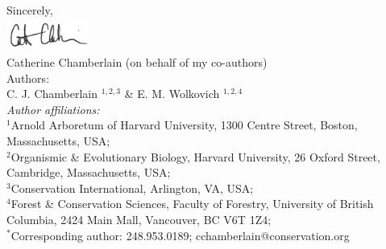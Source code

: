 \documentclass[11pt,a4paper]{article}
\begin{document}
\vspace{1.5ex}
\noindent Sincerely, \\
\includegraphics[width=0.2\textwidth]{full_signature.jpg} \\
\noindent Catherine Chamberlain (on behalf of my co-authors)
\vspace{2ex}\\
\noindent Authors:\\
C. J. Chamberlain $^{1,2,3}$ \& E. M. Wolkovich $^{1,2,4}$
\vspace{2ex}\\
\emph{Author affiliations:}\\
$^{1}$Arnold Arboretum of Harvard University, 1300 Centre Street, Boston, Massachusetts, USA; \\
$^{2}$Organismic \& Evolutionary Biology, Harvard University, 26 Oxford Street, Cambridge, Massachusetts, USA; \\
$^{3}$Conservation International, Arlington, VA, USA;\\
$^{4}$Forest \& Conservation Sciences, Faculty of Forestry, University of British Columbia, 2424 Main Mall, Vancouver, BC V6T 1Z4;\\
\vspace{2ex}
$^*$Corresponding author: 248.953.0189; cchamberlain@conservation.org\\
\end{document}
